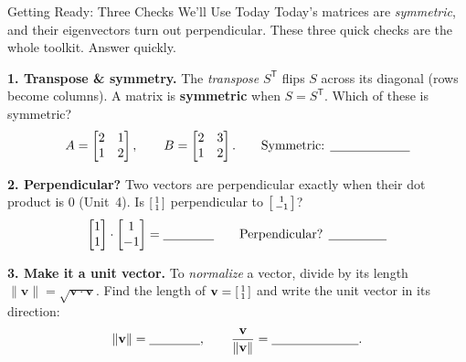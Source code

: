 \documentclass[10pt]{article}
\begin{document}
\namedateperiod

\vspace{0.12in}

\begin{notesbox}{Getting Ready: Three Checks We'll Use Today}
\small Today's matrices are \emph{symmetric}, and their eigenvectors turn out perpendicular. These three
quick checks are the whole toolkit. Answer quickly.

\vspace{4pt}
\textbf{1. Transpose \& symmetry.} The \emph{transpose} $S^{\mathsf T}$ flips $S$ across its diagonal (rows
become columns). A matrix is \textbf{symmetric} when $S=S^{\mathsf T}$. Which of these is symmetric?
\[
  A=\begin{bmatrix} 2 & 1 \\ 1 & 2 \end{bmatrix}, \qquad
  B=\begin{bmatrix} 2 & 3 \\ 1 & 2 \end{bmatrix}.
  \qquad\text{Symmetric: }\blank{2.2cm}
\]

\vspace{4pt}
\textbf{2. Perpendicular?} Two vectors are perpendicular exactly when their dot product is $0$ (Unit~4).
Is $\begin{bsmallmatrix}1\\1\end{bsmallmatrix}$ perpendicular to $\begin{bsmallmatrix}1\\-1\end{bsmallmatrix}$?
\[
  \begin{bmatrix}1\\1\end{bmatrix}\cdot\begin{bmatrix}1\\-1\end{bmatrix}=\blank{1.4cm}
  \qquad\text{Perpendicular? }\blank{1.6cm}
\]

\vspace{4pt}
\textbf{3. Make it a unit vector.} To \emph{normalize} a vector, divide by its length
$\|\mathbf{v}\|=\sqrt{\mathbf{v}\cdot\mathbf{v}}$. Find the length of $\mathbf{v}=\begin{bsmallmatrix}1\\1\end{bsmallmatrix}$
and write the unit vector in its direction:
\[
  \|\mathbf{v}\|=\blank{1.4cm}, \qquad \frac{\mathbf{v}}{\|\mathbf{v}\|}=\blank{2.4cm}.
\]
\end{notesbox}
\end{document}
